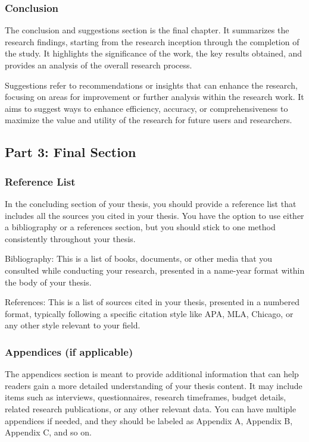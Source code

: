 \subsubsection{Conclusion}

The conclusion and suggestions section is the final chapter. It summarizes the research findings, starting from the research inception through the completion of the study. It highlights the significance of the work, the key results obtained, and provides an analysis of the overall research process.

Suggestions refer to recommendations or insights that can enhance the research, focusing on areas for improvement or further analysis within the research work. It aims to suggest ways to enhance efficiency, accuracy, or comprehensiveness to maximize the value and utility of the research for future users and researchers.

\subsection{Part 3: Final Section}

\subsubsection{Reference List}

In the concluding section of your thesis, you should provide a reference list that includes all the sources you cited in your thesis. You have the option to use either a bibliography or a references section, but you should stick to one method consistently throughout your thesis.

Bibliography: This is a list of books, documents, or other media that you consulted while conducting your research, presented in a name-year format within the body of your thesis.

References: This is a list of sources cited in your thesis, presented in a numbered format, typically following a specific citation style like APA, MLA, Chicago, or any other style relevant to your field.

\subsubsection{Appendices (if applicable)}

The appendices section is meant to provide additional information that can help readers gain a more detailed understanding of your thesis content. It may include items such as interviews, questionnaires, research timeframes, budget details, related research publications, or any other relevant data. You can have multiple appendices if needed, and they should be labeled as Appendix A, Appendix B, Appendix C, and so on.

